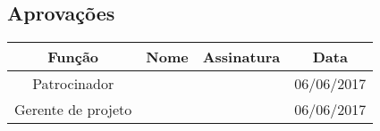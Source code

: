 \begin{landscape}
	\section{Aprovações}

	\begin{table}[H]
		\begin{tabularx}{\textwidth}{| c | c | X | c |}
			\hline
			\textbf{Função}  & \textbf{Nome}         & \textbf{Assinatura}        & \textbf{Data} \\
			\hline
			Patrocinador       & \projectSponsorName{} & \projectSponsorSignature{} &     06/06/2017          \\
			\hline
			Gerente de projeto & \projectManagerName{} & \projectManagerSignature{} &     06/06/2017          \\
			\hline
		\end{tabularx}
		\centering
	\end{table}

\end{landscape}